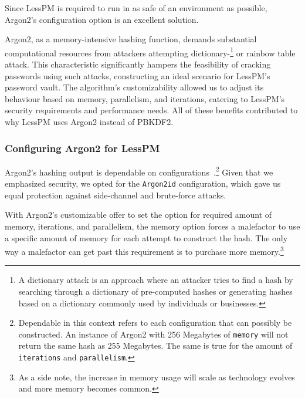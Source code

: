 
Since LessPM is required to run in as safe of an environment as possible,
Argon2's configuration option is an excellent solution.

Argon2, as a memory-intensive hashing function, demands substantial
computational resources from attackers attempting dictionary-\footnote{
  A dictionary attack is an approach where an attacker tries to find a hash by
  searching through a dictionary of pre-computed hashes or generating hashes
  based on a dictionary commonly used by individuals or businesses.
} or rainbow table attack.
This characteristic significantly hampers the feasibility of cracking
passwords using such attacks, constructing an ideal scenario for LessPM's
password vault.
The algorithm's customizability allowed us to adjust its behaviour
based on memory, parallelism, and iterations, catering to LessPM's security
requirements and performance needs.
All of these benefits contributed to why LessPM uses Argon2 instead of PBKDF2.

\subsubsection{Configuring Argon2 for LessPM}
Argon2's hashing output is dependable on
configurations~\cite{argon2specs}.\footnote{
  Dependable in this context refers to each configuration that can
  possibly be constructed.
  An instance of Argon2 with 256 Megabytes of \texttt{memory} will not return
  the same hash as 255 Megabytes.
  The same is true for the amount of \texttt{iterations} and
  \texttt{parallelism}.
}
Given that we emphasized security, we opted for the \texttt{Argon2id}
configuration, which gave us equal protection against side-channel and
brute-force attacks.

With Argon2's customizable offer to set the option for required amount of
memory, iterations, and parallelism, the memory option forces a malefactor to
use a specific amount of memory for each attempt to construct the hash.
The only way a malefactor can get past this requirement is to purchase more
memory.\footnote{
  As a side note, the increase in memory usage will scale as technology evolves
  and more memory becomes common.
}

